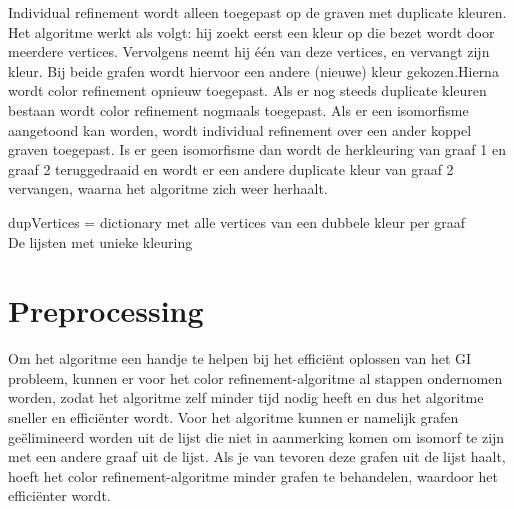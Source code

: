 \documentclass{article}
\begin{document}
Individual refinement wordt alleen toegepast op de graven met duplicate kleuren. Het algoritme werkt als volgt: hij zoekt eerst een kleur op die bezet wordt door meerdere vertices. Vervolgens neemt hij \'e\'en van deze vertices, en vervangt zijn kleur. Bij beide grafen wordt hiervoor een andere (nieuwe) kleur gekozen.Hierna wordt color refinement opnieuw toegepast. Als er nog steeds duplicate kleuren bestaan wordt color refinement nogmaals toegepast. Als er een isomorfisme aangetoond kan worden, wordt individual refinement over een ander koppel graven toegepast. Is er geen isomorfisme dan wordt de herkleuring van graaf 1 en graaf 2 teruggedraaid en wordt er een andere duplicate kleur van graaf 2 vervangen, waarna het algoritme zich weer herhaalt.\\

\begin{algorithm}[H]
	dupVertices = dictionary met alle vertices van een dubbele kleur per graaf\\
	\Return De lijsten met unieke kleuring
\end{algorithm}
\pagebreak


\section{Preprocessing}
Om het algoritme een handje te helpen bij het effici\"ent oplossen van het GI probleem, kunnen er voor het color refinement-algoritme al stappen ondernomen worden, zodat het algoritme zelf minder tijd nodig heeft en dus het algoritme sneller en effici\"enter wordt.
Voor het algoritme kunnen er namelijk grafen ge\"elimineerd worden uit de lijst die niet in aanmerking komen om isomorf te zijn met een andere graaf uit de lijst. Als je van tevoren deze grafen uit de lijst haalt, hoeft het color refinement-algoritme minder grafen te behandelen, waardoor het effici\"enter wordt.
\end{document}
